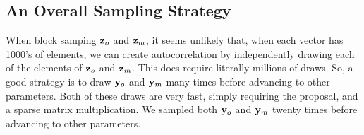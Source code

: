 \documentclass[11pt, titlepage]{article}
\begin{document}
\begin{spacing}{1.9}
\begin{flushleft}

\subsection{An Overall Sampling Strategy}

When block samping $\mathbf{z}_{o}$ and $\mathbf{z}_{m}$, it seems unlikely that, when each vector has 1000's of elements, we can create autocorrelation by independently drawing each of the elements of $\mathbf{z}_{o}$ and $\mathbf{z}_{m}$.  This does require literally millions of draws.  So, a good strategy is to draw $\mathbf{y}_{o}$ and $\mathbf{y}_{m}$ many times before advancing to other parameters.  Both of these draws are very fast, simply requiring the proposal, and a sparse matrix multiplication.  We sampled both $\mathbf{y}_{o}$ and $\mathbf{y}_{m}$ twenty times before advancing to other parameters.




\end{flushleft}
\end{spacing}
\end{document}
